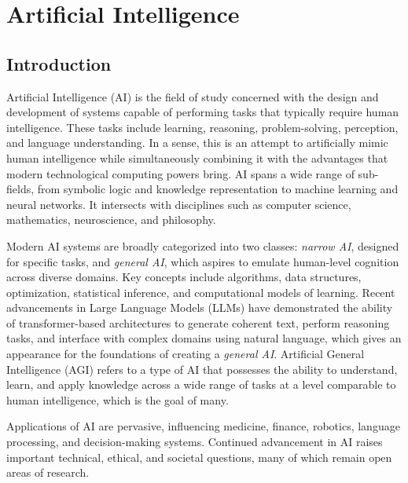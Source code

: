 \chapter{Artificial Intelligence}
\thispagestyle{fancy}


\section{Introduction}

Artificial Intelligence (AI) is the field of study concerned with the design and development of systems capable of performing tasks that typically require human intelligence. These tasks include learning, reasoning, problem-solving, perception, and language understanding. In a sense, this is an attempt to artificially mimic human intelligence while simultaneously combining it with the advantages that modern technological computing powers bring. AI spans a wide range of sub-fields, from symbolic logic and knowledge representation to machine learning and neural networks. It intersects with disciplines such as computer science, mathematics, neuroscience, and philosophy. 

Modern AI systems are broadly categorized into two classes: \textit{narrow AI}, designed for specific tasks, and \textit{general AI}, which aspires to emulate human-level cognition across diverse domains. Key concepts include algorithms, data structures, optimization, statistical inference, and computational models of learning. Recent advancements in Large Language Models (LLMs) have demonstrated the ability of transformer-based architectures to generate coherent text, perform reasoning tasks, and interface with complex domains using natural language, which gives an appearance for the foundations of creating a \textit{general AI}. Artificial General Intelligence (AGI) refers to a type of AI that possesses the ability to understand, learn, and apply knowledge across a wide range of tasks at a level comparable to human intelligence, which is the goal of many.

Applications of AI are pervasive, influencing medicine, finance, robotics, language processing, and decision-making systems. Continued advancement in AI raises important technical, ethical, and societal questions, many of which remain open areas of research.
